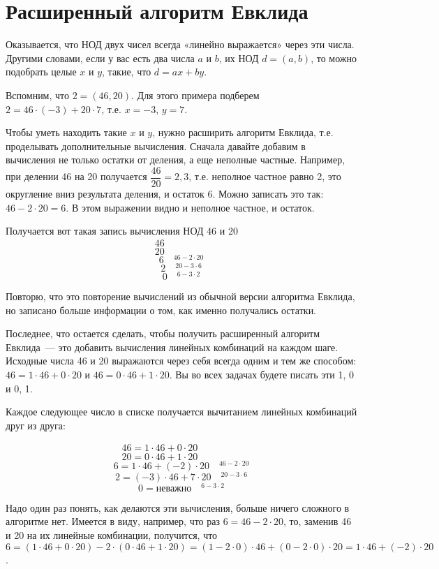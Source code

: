 \documentclass{article}
\begin{document}
    \section{Расширенный алгоритм Евклида}
    Оказывается, что НОД двух чисел всегда «линейно выражается» через эти числа.
    Другими словами, если у вас есть два числа $a$ и $b$, их НОД $d = (a, b)$, то можно подобрать целые
    $x$ и $y$, такие, что $d = ax + by$.

    Вспомним, что $2 = (46, 20)$.
    Для этого примера подберем $2 = 46\cdot(-3) + 20\cdot7$, т.е. $x=-3$, $y=7$.

    Чтобы уметь находить такие $x$ и $y$, нужно расширить алгоритм Евклида, т.е. проделывать дополнительные вычисления. Сначала давайте добавим в вычисления не только остатки от деления, а еще неполные частные. Например, при делении 46 на 20 получается $\dfrac{46}{20} = 2,3$, т.е. неполное частное равно 2, это округление вниз результата деления, и остаток 6. Можно записать это так: $46 - 2\cdot20 = 6$. В этом выражении видно и неполное частное, и остаток.

    Получается вот такая запись вычисления НОД 46 и 20
    \[46 \quad {}^{\phantom{10-10\cdot10}}\]
    \[20 \quad {}^{\phantom{10-10\cdot10}}\]
    \[6 \quad {}^{46 - 2\cdot20}\]
    \[2 \quad {}^{20 - 3\cdot6}\]
    \[0 \quad {}^{6 - 3\cdot2}\]

    Повторю, что это повторение вычислений из обычной версии алгоритма Евклида, но записано больше информации о том, как именно получались остатки.

    Последнее, что остается сделать, чтобы получить расширенный алгоритм Евклида~--- это добавить вычисления линейных комбинаций на каждом шаге. Исходные числа 46 и 20 выражаются через себя всегда одним и тем же способом: $46 = 1\cdot46+0\cdot20$ и $46 = 0\cdot46+1\cdot20$. Вы во всех задачах будете писать эти 1, 0 и 0, 1.

    \pagebreak

    Каждое следующее число в списке получается вычитанием линейных комбинаций друг из друга:

    \[46 = 1\cdot46+0\cdot20 \quad {}^{\phantom{10-10\cdot10}}\]
    \[20 = 0\cdot46+1\cdot20 \quad {}^{\phantom{10-10\cdot10}}\]
    \[6 = 1\cdot46+(-2)\cdot20 \quad {}^{46 - 2\cdot20}\]
    \[2 = (-3)\cdot46+7\cdot20 \quad {}^{20 - 3\cdot6}\]
    \[0 = \mbox{неважно} \quad {}^{6 - 3\cdot2}\]

    Надо один раз понять, как делаются эти вычисления, больше ничего сложного в алгоритме нет.
    Имеется в виду, например, что раз $6 = 46 - 2\cdot20$, то, заменив 46 и 20 на их линейные комбинации, получится, что $6 = (1\cdot46+0\cdot20) - 2\cdot(0\cdot46+1\cdot20) = (1 - 2\cdot 0)\cdot46 + (0-2\cdot0)\cdot20=1\cdot46+(-2)\cdot20$.
\end{document}
